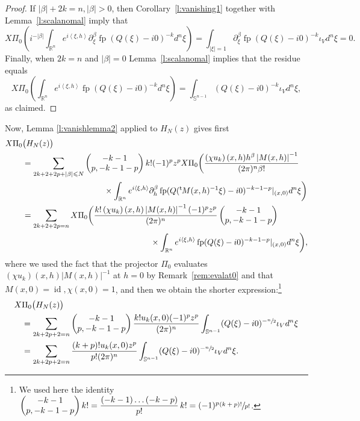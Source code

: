 \documentclass[JEP,XML,SOM,Unicode]{cedram}
\theoremstyle{definition}
\let\euler X
\let\Feuler V
\DeclareMathOperator\id{id}
\DeclareMathOperator*{\pf}{fp}
\newcommand{\module}[1]{\left|#1\right|}
\renewcommand{\t}{{{}^{\mathrm{t}\mkern-2mu}}}
\begin{document}
\begin{proof}
If $\vert \beta\vert+2k=n, \vert\beta\vert>0$, then {Corollary}~\ref{l:vanishing1} together with Lemma~\ref{l:scalanomal} imply that
\[
\euler\Pi_0\left(i^{-\vert\beta\vert} \int_{\mathbb{R}^n} e^{i\left\langle\xi,h\right\rangle} \partial_\xi^\beta \pf(Q(\xi)-i0)^{-k} d^n\xi \right)
= \int_{\vert \xi\vert=1} \partial_\xi^\beta \pf(Q(\xi)-i0)^{-k} \iota_\Feuler d^n\xi =0.
\]
Finally, when $2k=n$ and $\vert\beta\vert=0$ Lemma~\ref{l:scalanomal} implies that
the residue equals
\[
\euler\Pi_0\left(\int_{\mathbb{R}^n} e^{i\left\langle\xi,h\right\rangle} \pf(Q(\xi)-i0)^{-k} d^n\xi \right)=\int_{\mathbb{S}^{n-1}}
(Q(\xi)-i0)^{-k} \iota_\Feuler d^n\xi,
\]
as claimed.
\end{proof}

Now, Lemma \ref{l:vanishlemma2} applied to $H_N(z)$ gives first
\[
\begin{aligned}
\euler\Pi_0 &\big(H_N(z)\big)\\
&=\sum_{2k+2+2p+\vert \beta\vert\leqslant N}\begin{pmatrix}
-k-1\\
p,-k-1-p
\end{pmatrix} k! {(-1)^p} z^p
\euler\Pi_0\biggl(\frac{\left(\chi u_k\right)(x,h)h^\beta\module{M(x,h)}^{-1}}{(2\pi)^n\beta !}\\
&\hspace*{3.5cm}\times\int_{\mathbb{R}^n}e^{i\left\langle\xi,h\right\rangle}
\partial^\beta_h \pf(Q(\t M(x, h)^{-1}\xi)-i0)^{-k-1-p}|_{(x,0)}d^n\xi\biggr)
\\
&=
\sum_{2k+2+2p=n }
\euler\Pi_0\bigg(\frac{k!\left(\chi u_k\right)(x,h)\module{M(x,h)}^{-1}{(-1)^p} z^p}{(2\pi)^n} \begin{pmatrix}
-k-1\\
p,-k-1-p
\end{pmatrix}\\
&\hspace*{5.5cm}\times \int_{\mathbb{R}^n}e^{i\left\langle\xi,h\right\rangle}
\pf(Q(\xi)-i0)^{-k-1-p}|_{(x,0)}d^n\xi\bigg),
\end{aligned}
\]
where we used the fact that the projector $\Pi_0$ evaluates $\left(\chi u_k\right)(x,h)\module{M(x,h)}^{-1}$ at $h=0$ by Remark~\ref{rem:evalat0} and that $M(x,0)=\id, \chi(x,0)=1$, and then we obtain the shorter expression:\footnote{We used here the identity
$\begin{pmatrix}
-k-1\\
p,-k-1-p
\end{pmatrix} k!= \dfrac{(-k-1)\dots (-k-p) }{p!}\,k!=(-1)^p\sfrac{(k+p)!}{p!} $.}
\begin{align}
\euler&\Pi_0 \big(H_N(z)\big)\notag\\\label{eq:shorter}
&=\sum_{2k+2p+2=n } \begin{pmatrix}
-k-1\\
p,-k-1-p
\end{pmatrix}
\frac{k!u_k(x,0){(-1)^p}z^p}{(2\pi)^n}\int_{\mathbb{S}^{n-1}}
(Q(\xi)-i0)^{-\sfrac{n}{2}} \iota_\Feuler d^n\xi\\
&=\sum_{2k+2p+2=n }
\frac{(k+p)!u_k(x,0)z^p}{p!(2\pi)^n}\int_{\mathbb{S}^{n-1}}
(Q(\xi)-i0)^{-\sfrac{n}{2}} \iota_\Feuler d^n\xi.\notag
\end{align}
\end{document}
